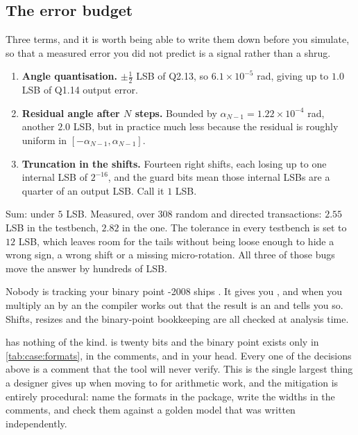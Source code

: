 \subsection{The error budget}

Three terms, and it is worth being able to write them down before you
simulate, so that a measured error you did not predict is a signal rather
than a shrug.

\begin{enumerate}
  \item \textbf{Angle quantisation.} $\pm\frac12$ LSB of Q2.13, so
        $6.1\times10^{-5}$ rad, giving up to $1.0$ LSB of Q1.14 output error.
  \item \textbf{Residual angle after $N$ steps.} Bounded by $\alpha_{N-1} =
        1.22\times10^{-4}$ rad, another $2.0$ LSB, but in practice much less
        because the residual is roughly uniform in
        $[-\alpha_{N-1}, \alpha_{N-1}]$.
  \item \textbf{Truncation in the shifts.} Fourteen right shifts, each losing
        up to one internal LSB of $2^{-16}$, and the guard bits mean those
        internal LSBs are a quarter of an output LSB. Call it $1$ LSB.
\end{enumerate}

Sum: under $5$ LSB. Measured, over 308 random and directed transactions:
$2.55$ LSB in the \VHDL{} testbench, $2.82$ in the \SV{} one. The tolerance
in every testbench is set to $12$ LSB, which leaves room for the tails without
being loose enough to hide a wrong sign, a wrong shift or a missing
micro-rotation. All three of those bugs move the answer by hundreds of LSB.

\begin{gotcha}{Nobody is tracking your binary point}
\VHDL{}-2008 ships . It gives you , and when you multiply an  by an
 the compiler works out that the result is an
 and tells you so. Shifts, resizes and the
binary-point bookkeeping are all checked at analysis time.

\SV{} has nothing of the kind.  is twenty bits and the binary
point exists only in \cref{tab:case:formats}, in the comments, and in your
head. Every one of the decisions above is a comment that the tool will never
verify. This is the single largest thing a \VHDL{} designer gives up when
moving to \SV{} for arithmetic work, and the mitigation is entirely
procedural: name the formats in the package, write the widths in the
comments, and check them against a golden model that was written
independently.
\end{gotcha}

